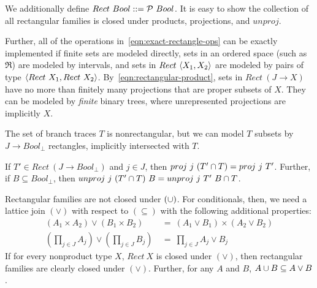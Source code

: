 \documentclass{llncs}
\newcommand{\join}{\vee}
\begin{document}
We additionally define $Rect~Bool ::= \mathcal{P}~Bool$.
It is easy to show the collection of all rectangular families is closed under products, projections, and $unproj$.

Further, all of the operations in~\eqref{eqn:exact-rectangle-ops} can be exactly implemented if finite sets are modeled directly, sets in an ordered space (such as $\Re$) are modeled by intervals, and sets in $Rect~\langle{X_1,X_2}\rangle$ are modeled by pairs of type $\langle{Rect~X_1,Rect~X_2}\rangle$.
By~\eqref{eqn:rectangular-product}, sets in $Rect~(J \to X)$ have no more than finitely many projections that are proper subsets of $X$.
They can be modeled by \emph{finite} binary trees, where unrepresented projections are implicitly $X$.

The set of branch traces $T$ is nonrectangular, but we can model $T$ subsets by $J \to Bool_\bot$ rectangles, implicitly intersected with $T$.

\begin{theorem}[$T$ model]
If $T' \in Rect~(J \to Bool_\bot)$ and $j \in J$, then $proj~j~(T' \cap T) = proj~j~T'$.
Further, if $B \subseteq Bool_\bot$, then $unproj~j~(T' \cap T)~B = unproj~j~T'~B \cap T$.
\end{theorem}

Rectangular families are not closed under $(\cup)$.
For conditionals, then, we need a lattice join $(\join)$ with respect to $(\subseteq)$ with the following additional properties:
\begin{equation}
\begin{aligned}
	(A_1 \times A_2) \join (B_1 \times B_2) &\ = \ (A_1 \join B_1) \times (A_2 \join B_2) \\
	(\textstyle\prod_{j \in J} A_j) \join (\textstyle\prod_{j \in J} B_j) &\ = \ \textstyle\prod_{j \in J} A_j \join B_j
\label{eqn:join-laws}
\end{aligned}
\end{equation}
If for every nonproduct type $X$, $Rect~X$ is closed under $(\join)$, then rectangular families are clearly closed under $(\join)$. Further, for any $A$ and $B$, $A \u B \subseteq A \join B$.
\end{document}
